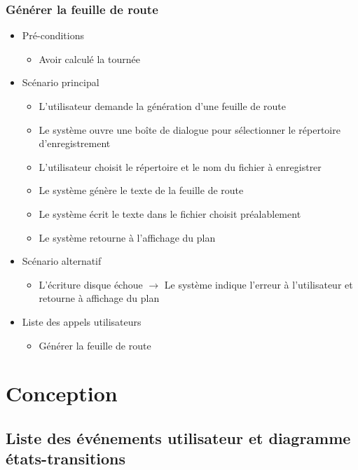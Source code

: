 \documentclass[10pt,a4paper]{book}
\begin{document}
\subsection{Générer la feuille de route}
\begin{itemize}
	\item{Pré-conditions}
	\begin{itemize}
		\item{Avoir calculé la tournée}
	\end{itemize}
	\item{Scénario principal}
	\begin{itemize}
		\item{L’utilisateur demande la génération d’une feuille de route}
		\item{Le système ouvre une boîte de dialogue pour sélectionner le répertoire d’enregistrement}
		\item{L’utilisateur choisit le répertoire et le nom du fichier à enregistrer}
		\item{Le système génère le texte de la feuille de route}
		\item{Le système écrit le texte dans le fichier choisit préalablement}
		\item{Le système retourne à l’affichage du plan}
	\end{itemize}
	\item{Scénario alternatif}
	\begin{itemize}
		\item{L’écriture disque échoue $\rightarrow$
Le système indique l’erreur à l'utilisateur et retourne à affichage du plan}
	\end{itemize}
	\item{Liste des appels utilisateurs}
	\begin{itemize}
		\item{Générer la feuille de route}
	\end{itemize}
\end{itemize}
\chapter{Conception}
\section{Liste des événements utilisateur et diagramme états-transitions}
\end{document}

